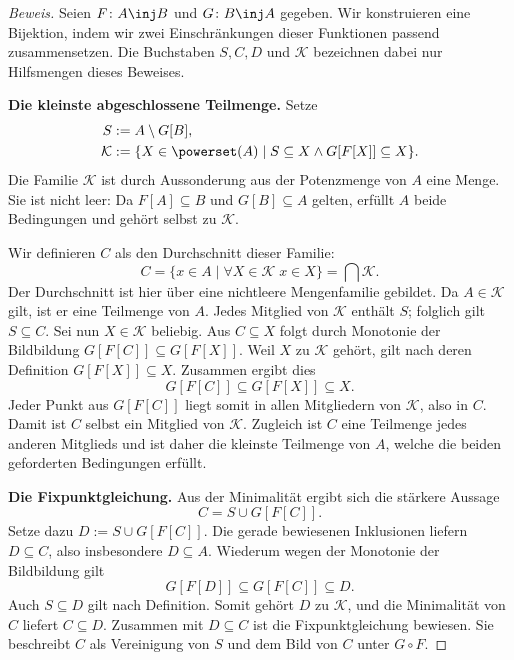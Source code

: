 \begin{proof}[Beweis]
Seien \(F\colon A\inj B\) und \(G\colon B\inj A\) gegeben.
Wir konstruieren eine Bijektion, indem wir zwei Einschränkungen dieser
Funktionen passend zusammensetzen. Die Buchstaben \(S,C,D\) und
\(\mathcal K\) bezeichnen dabei nur Hilfsmengen dieses Beweises.

\medskip\noindent
\textbf{Die kleinste abgeschlossene Teilmenge.}
Setze
\[
  \begin{aligned}
    S&:=A\setminus G[B],\\
    \mathcal K&:=\{X\in\powerset(A)\mid
      S\subseteq X\land G[F[X]]\subseteq X\}.
  \end{aligned}
\]
Die Familie \(\mathcal K\) ist durch Aussonderung aus der Potenzmenge
von \(A\) eine Menge. Sie ist nicht leer: Da \(F[A]\subseteq B\)
und \(G[B]\subseteq A\) gelten, erfüllt \(A\) beide Bedingungen und
gehört selbst zu \(\mathcal K\).

Wir definieren \(C\) als den Durchschnitt dieser Familie:
\[
  C=\{x\in A\mid \forall X\in\mathcal K\;x\in X\}
   =\bigcap\mathcal K.
\]
Der Durchschnitt ist hier über eine nichtleere Mengenfamilie gebildet.
Da \(A\in\mathcal K\) gilt, ist er eine Teilmenge von \(A\). Jedes Mitglied von
\(\mathcal K\) enthält \(S\); folglich gilt \(S\subseteq C\).
Sei nun \(X\in\mathcal K\) beliebig. Aus \(C\subseteq X\)
folgt durch Monotonie der Bildbildung
\(G[F[C]]\subseteq G[F[X]]\). Weil \(X\) zu \(\mathcal K\)
gehört, gilt nach deren Definition \(G[F[X]]\subseteq X\).
Zusammen ergibt dies
\[
  G[F[C]]\subseteq G[F[X]]\subseteq X.
\]
Jeder Punkt aus \(G[F[C]]\) liegt somit in allen Mitgliedern von
\(\mathcal K\), also in \(C\). Damit ist \(C\) selbst ein Mitglied
von \(\mathcal K\). Zugleich ist \(C\) eine Teilmenge jedes anderen Mitglieds
und ist daher die kleinste Teilmenge von \(A\), welche die beiden
geforderten Bedingungen erfüllt.

\medskip\noindent
\textbf{Die Fixpunktgleichung.}
Aus der Minimalität ergibt sich die stärkere Aussage
\[
  C=S\cup G[F[C]].
\]
Setze dazu \(D:=S\cup G[F[C]]\). Die gerade bewiesenen Inklusionen
liefern \(D\subseteq C\), also insbesondere \(D\subseteq A\).
Wiederum wegen der Monotonie der Bildbildung gilt
\[
  G[F[D]]\subseteq G[F[C]]\subseteq D.
\]
Auch \(S\subseteq D\) gilt nach Definition. Somit gehört \(D\)
zu \(\mathcal K\), und die Minimalität von \(C\) liefert
\(C\subseteq D\). Zusammen mit \(D\subseteq C\) ist die
Fixpunktgleichung bewiesen. Sie beschreibt \(C\) als Vereinigung
von \(S\) und dem Bild von \(C\) unter \(G\circ F\).


\end{proof}
